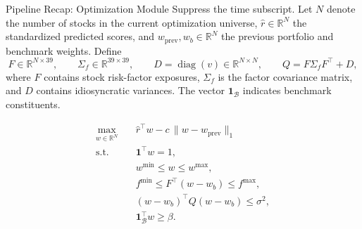 \documentclass[aspectratio=169,xcolor=dvipsnames]{beamer}
\begin{document}
\begin{frame}{Pipeline Recap: Optimization Module}
    \small
    Suppress the time subscript. Let $N$ denote the number of stocks
    in the current optimization universe, $\hat r\in\mathbb{R}^N$
    the standardized predicted scores, and
    $w_{\mathrm{prev}},w_b\in\mathbb{R}^N$ the previous portfolio
    and benchmark weights. Define
    \[
    F\in\mathbb{R}^{N\times39},\qquad
    \Sigma_f\in\mathbb{R}^{39\times39},\qquad
    D=\operatorname{diag}(v)\in\mathbb{R}^{N\times N},\qquad
    Q=F\Sigma_f F^\top+D,
    \]
    where $F$ contains stock risk-factor exposures, $\Sigma_f$ is the
    factor covariance matrix, and $D$ contains idiosyncratic variances.
    The vector $\mathbf{1}_{\mathcal B}$ indicates benchmark constituents.

    \[
    \boxed{
    \begin{aligned}
    \max_{w\in\mathbb{R}^N}\quad
    & \hat r^\top w-c\,\lVert w-w_{\mathrm{prev}}\rVert_1 \\[2pt]
    \text{s.t.}\quad
    & \mathbf{1}^\top w=1,\\
    & w^{\min}\leq w\leq w^{\max},\\
    & f^{\min}\leq F^\top(w-w_b)\leq f^{\max},\\
    & (w-w_b)^\top Q(w-w_b)\leq\sigma^2,\\
    & \mathbf{1}_{\mathcal B}^\top w\geq\beta.
    \end{aligned}}
    \]
\end{frame}
\end{document}
